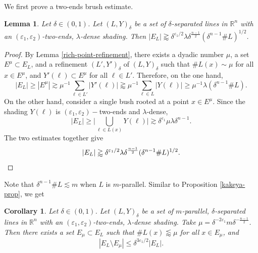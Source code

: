 \documentclass{amsart}
\numberwithin{equation}{section}
\newtheorem{lemma}[theorem]{Lemma}
\newtheorem{corollary}[theorem]{Corollary}
\newcommand{\de}{\delta}
\newcommand{\e}{\varepsilon}
\newcommand{\la}{\lambda}
\newcommand{\ZR}{\mathbb{R}}
\begin{document}
We first prove a two-ends brush estimate.
\begin{lemma}
\label{bush-lem-high-d}
Let $\de\in(0,1)$.
Let $(L,Y)_\de$ be a set of $\de$-separated lines in $\ZR^n$ with an $(\e_1, \e_2)$-two-ends, $\la$-dense shading. Then $|E_L|\gtrapprox \de^{\e_1/2}\la\de^{\frac{n-1}{2}}(\de^{n-1}\#L)^{1/2}$.
\end{lemma}
\begin{proof}
By Lemma \ref{rich-point-refinement}, there exists a dyadic number $\mu$, a set $E^\mu\subset E_L$, and a refinement $(L',Y')_\de$ of $(L,Y)_\de$ such that $\#L(x)\sim\mu$ for all $x\in E^\mu$, and $Y'(\ell)\subset E^\mu$ for all $\ell\in L'$.
Therefore, on the one hand,
\begin{equation}
    |E_L|\geq|E^\mu|\gtrsim \mu^{-1}\sum_{\ell\in L'}|Y'(\ell)|\gtrapprox \mu^{-1}\sum_{\ell\in L}|Y(\ell)|\geq \mu^{-1}\la(\de^{n-1}\# L).
\end{equation}
On the other hand, consider a single bush rooted at a point $x\in E^\mu$. 
Since the shading $Y(\ell)$ is $(\e_1,\e_2)-$two-ends and $\la$-dense, 
\begin{equation}
    |E_L|\geq\big|\bigcup_{\ell\in L(x)}Y(\ell)\big|\gtrsim \de^{\e_1} \mu\la\de^{n-1}.
\end{equation}
The two estimates together give
\begin{equation}
    |E_L|\gtrapprox \de^{\e_1/2}\la\de^\frac{n-1}{2}(\de^{n-1}\#L)^{1/2}. \qedhere
\end{equation}
\end{proof}



Note that $\de^{n-1}\#L\lesssim m$ when $L$ is $m$-parallel. 
Similar to Proposition \ref{kakeya-prop}, we get

\begin{corollary}
\label{cor-3}
Let $\de\in(0,1)$.
Let $(L,Y)_\de$ be a set of $m$-parallel, $\de$-separated lines in $\ZR^n$ with an $(\e_1, \e_2)$-two-ends, $\la$-dense shading. Take $\mu=\de^{-2\e_1}m\de^{-\frac{n-1}{2}}$.
Then there exists a set $E_\mu\subset E_L$ such that $\# L(x)\lessapprox \mu$ for all $x\in E_\mu$, and
\begin{equation}
    |E_L\setminus E_\mu|\leq \de^{3\e_1/2}|E_L|.
\end{equation}
\end{corollary}

\smallskip
\end{document}
